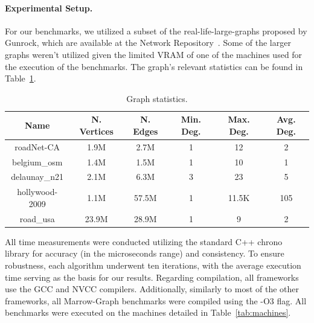 \paragraph{\textbf{Experimental Setup}.}
%
For our benchmarks, we utilized a subset of the real-life-large-graphs proposed by Gunrock, which are available at the Network Repository~\cite{site:graph_rep}. Some of the larger graphs weren't utilized given the limited \gls{VRAM} of one of the machines used for the execution of the benchmarks. The graph's relevant statistics can be found in Table~\ref{tab:graph_stats}.


\begin{table}
    \centering
    \small
    \begin{tabular}{|c|c|c|c|c|c|}
        \hline
        Name & N. Vertices & N. Edges & Min. Deg. & Max. Deg. & Avg. Deg. \\
        \hline
        \hline
        roadNet-CA & 1.9M & 2.7M & 1 & 12 & 2 \\
        belgium\_osm & 1.4M & 1.5M  & 1 & 10 & 1 \\
        delaunay\_n21 & 2.1M & 6.3M  & 3 & 23 & 5 \\
        hollywood-2009 & 1.1M & 57.5M  & 1 & 11.5K & 105 \\
        road\_usa & 23.9M & 28.9M  & 1 & 9 & 2 \\
        \hline
    \end{tabular}
    \caption{Graph statistics.}
    \label{tab:graph_stats}
\end{table}

All time measurements were conducted utilizing the standard C++ chrono library for accuracy (in the microseconds range) and consistency. To ensure robustness, each algorithm underwent ten iterations, with the average execution time serving as the basis for our results. Regarding compilation, all frameworks use the GCC and NVCC compilers. Additionally, similarly to most of the other frameworks, all Marrow-Graph benchmarks were compiled using the -O3 flag. All benchmarks were executed on the machines detailed in Table~\ref{tab:machines}.

